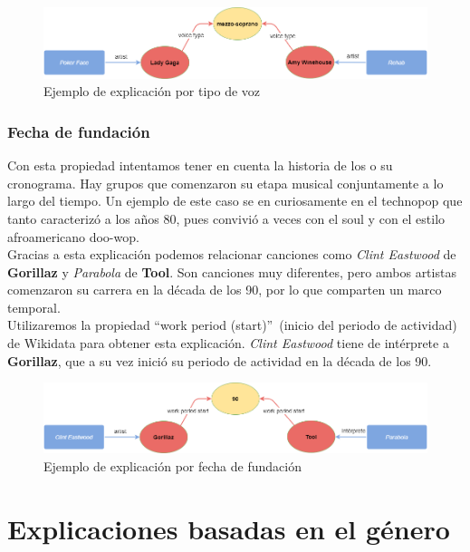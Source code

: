 \begin{figure}[h!]
	\centering
	\includegraphics[width = 1\textwidth]{Imagenes/Bitmap/Voz ejemplo.png}
	\caption{Ejemplo de explicación por tipo de voz}
	\label{fig:sampleImage}
\end{figure}

\subsubsection*{Fecha de fundación}

Con esta propiedad intentamos tener en cuenta la historia de los o su cronograma. Hay grupos que comenzaron su etapa musical  conjuntamente a lo largo del tiempo. Un ejemplo de este caso se en curiosamente en el technopop que tanto caracterizó a los años 80, pues convivió a veces con el soul y con el estilo afroamericano doo-wop.\\

Gracias a esta explicación podemos relacionar canciones como \textit{Clint Eastwood} de \textbf{Gorillaz} y \textit{Parabola} de \textbf{Tool}. Son canciones muy diferentes, pero ambos artistas comenzaron su carrera en la década de los 90, por lo que comparten un marco temporal.\\

Utilizaremos la propiedad ``work period (start)''~(inicio del periodo de actividad) de Wikidata para obtener esta explicación. \textit{Clint Eastwood} tiene de intérprete a \textbf{Gorillaz}, que a su vez inició su periodo de actividad en la década de los 90.\\

\begin{figure}[h!]
	\centering
	\includegraphics[width = 1\textwidth]{Imagenes/Bitmap/Fundacion ejemplo.png}
	\caption{Ejemplo de explicación por fecha de fundación}
	\label{fig:sampleImage}
\end{figure}

\section{Explicaciones basadas en el género}

